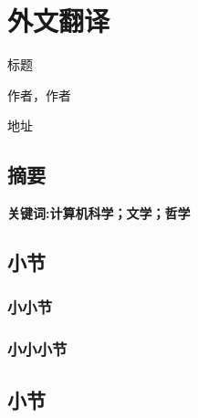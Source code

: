 
\section{外文翻译}

 {
  \sanhao \bfseries \onehalfspacing
  \begin{center}
      标题

      \wuhao 作者，作者

      地址
  \end{center}
 }

\subsection*{摘要}

\lipsum[2]

\noindent \textbf{
    关键词:计算机科学；文学；哲学
}

\subsection{小节}
\lipsum[3]

\subsubsection{小小节}
\lipsum[3]

\subsubsection{小小小节}
\lipsum[4]

\lipsum[7]

\subsection{小节}
\lipsum[8]
